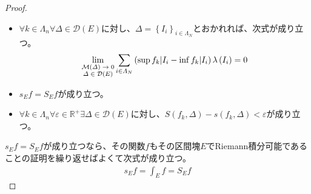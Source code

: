 \documentclass[dvipdfmx]{jsarticle}
\begin{document}
\begin{proof}
\begin{itemize}
\item
  $\forall k \in \varLambda_{n}\forall\varDelta \in \mathcal{D}(E)$に対し、$\varDelta = \left\{ I_{i} \right\}_{i \in \varLambda_{N}}$とおかれれば、次式が成り立つ。
\begin{align*}
\lim_{\scriptsize \begin{matrix}
\mathcal{M}(\varDelta) \rightarrow 0 \\
\varDelta \in \mathcal{D}(E) \\
\end{matrix}}{\sum_{i \in \varLambda_{N}} {\left( \sup{f_{k}|I_{i}} - \inf{f_{k}|I_{i}} \right)\lambda\left( I_{i} \right)}} = 0
\end{align*}
\item
  $s_{E}f = S_{E}f$が成り立つ。
\item
  $\forall k \in \varLambda_{n}\forall\varepsilon \in \mathbb{R}^{+}\exists\varDelta \in \mathcal{D}(E)$に対し、$S\left( f_{k},\varDelta \right) - s\left( f_{k},\varDelta \right) < \varepsilon$が成り立つ。
\end{itemize}
$s_{E}f = S_{E}f$が成り立つなら、その関数$f$もその区間塊$E$でRiemann積分可能であることの証明を繰り返せばよくて次式が成り立つ。
\begin{align*}
s_{E}f = \int_{E} f = S_{E}f
\end{align*}
\end{proof}
\end{document}
